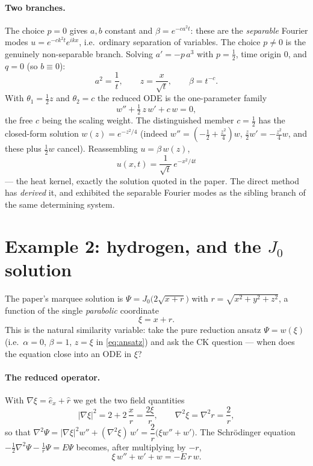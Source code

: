 \documentclass[11pt]{article}
\begin{document}
\paragraph{Two branches.}
The choice $p=0$ gives $a,b$ constant and $\beta=e^{-ca^2t}$: these are the
\emph{separable} Fourier modes $u=e^{-ck^2t}e^{ikx}$, i.e.\ ordinary
separation of variables. The choice $p\neq0$ is the genuinely
non-separable branch. Solving $a'=-p\,a^3$ with $p=\tfrac12$, time origin
$0$, and $q=0$ (so $b\equiv0$):
\[
  a^2=\frac1t,\qquad z=\frac{x}{\sqrt t},\qquad \beta=t^{-c}.
\]
With $\theta_1=\tfrac12 z$ and $\theta_2=c$ the reduced ODE is the
one-parameter family
\begin{equation}
  w''+\tfrac12\,z\,w'+c\,w=0,
  \label{eq:heat-ode}
\end{equation}
the free $c$ being the scaling weight. The distinguished member $c=\tfrac12$
has the closed-form solution $w(z)=e^{-z^2/4}$ (indeed
$w''=(-\tfrac12+\tfrac{z^2}{4})w$, $\tfrac z2 w'=-\tfrac{z^2}{4}w$, and these
plus $\tfrac12 w$ cancel). Reassembling $u=\beta\,w(z)$,
\begin{equation}
  \boxed{\,u(x,t)=\frac{1}{\sqrt t}\,e^{-x^2/4t}\,}
\end{equation}
--- the heat kernel, exactly the solution quoted in the paper. The direct
method has \emph{derived} it, and exhibited the separable Fourier modes as
the sibling branch of the same determining system.

\section{Example 2: hydrogen, and the $J_0$ solution}

The paper's marquee solution is
$\Psi=J_0\!\bigl(2\sqrt{x+r}\bigr)$ with $r=\sqrt{x^2+y^2+z^2}$, a
function of the single \emph{parabolic} coordinate
\begin{equation}
  \xi=x+r.
\end{equation}
This is the natural similarity variable: take the pure reduction ansatz
$\Psi=w(\xi)$ (i.e.\ $\alpha=0$, $\beta=1$, $z=\xi$ in \eqref{eq:ansatz}) and
ask the CK question --- when does the equation close into an ODE in $\xi$?

\paragraph{The reduced operator.} With $\nabla\xi=\hat e_x+\hat r$ we get the
two field quantities
\[
  |\nabla\xi|^2=2+2\,\frac{x}{r}=\frac{2\xi}{r},
  \qquad
  \nabla^2\xi=\nabla^2 r=\frac{2}{r},
\]
so that $\nabla^2\Psi=|\nabla\xi|^2 w''+(\nabla^2\xi)\,w'
=\dfrac{2}{r}\bigl(\xi w''+w'\bigr)$. The Schr\"odinger equation
$-\tfrac12\nabla^2\Psi-\tfrac1r\Psi=E\Psi$ becomes, after multiplying by $-r$,
\begin{equation}
  \xi\,w''+w'+w=-E\,r\,w.
  \label{eq:hyd}
\end{equation}
\end{document}
